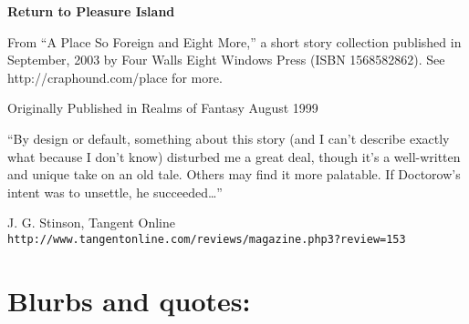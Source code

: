 

\newenvironment{authorof}{\begin{flushright}\sffamily}{\end{flushright}}


\begin{center}
\textbf{\huge\textsf{
Return to Pleasure Island
}}
\end{center}


\noindent

From ``A Place So Foreign and Eight More,'' a short story
collection published in September, 2003 by Four Walls Eight Windows
Press (ISBN 1568582862). See http://craphound.com/place for more.

Originally Published in Realms of Fantasy August 1999

``By design or default, something about this story (and I can't describe 
exactly what because I don't know) disturbed me a great deal, though it's a 
well-written and unique take on an old tale. Others may find it more palatable. 
If Doctorow's intent was to unsettle, he succeeded\ldots{}''

\begin{authorof}
  J. G. Stinson,
  Tangent Online\\
  \texttt{http://www.tangentonline.com/reviews/magazine.php3?review=153}
\end{authorof}

\section{Blurbs and quotes:}

